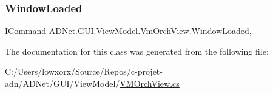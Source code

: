 \subsubsection{\texorpdfstring{Window\+Loaded}{WindowLoaded}}
{\footnotesize\ttfamily I\+Command A\+D\+Net.\+G\+U\+I.\+View\+Model.\+Vm\+Orch\+View.\+Window\+Loaded\hspace{0.3cm}{\ttfamily [get]}, {\ttfamily [set]}}



The documentation for this class was generated from the following file\+:\begin{DoxyCompactItemize}
\item 
C\+:/\+Users/lowxorx/\+Source/\+Repos/c-\/projet-\/adn/\+A\+D\+Net/\+G\+U\+I/\+View\+Model/\hyperlink{_v_m_orch_view_8cs}{V\+M\+Orch\+View.\+cs}\end{DoxyCompactItemize}

